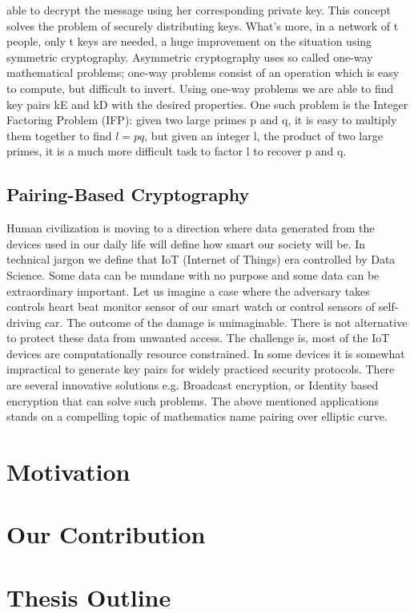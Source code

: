 able to decrypt the message using her corresponding private key. This concept solves the problem of securely distributing keys. What’s more, in a network of t people, only t keys are needed, a huge improvement on the situation using symmetric cryptography.
Asymmetric cryptography uses so called one-way mathematical problems; one-way problems consist of an operation which is easy to compute, but difficult to invert. Using one-way problems we are able to find key pairs kE and kD with the desired properties.
One such problem is the Integer Factoring Problem (IFP): given two large primes p and q, it is easy to multiply them together to find $l = pq$, but given an integer l, the product of two large primes, it is a much more difficult task to factor l to recover p and q.

\subsection{Pairing-Based Cryptography}
\label{ch1_subsec_pbc}
Human civilization is moving to a direction where data generated from the devices used in our daily life will define how smart our society will be.
In technical jargon we define that IoT (Internet of Things) era controlled by Data Science.
Some data can be mundane with no purpose and some data can be extraordinary important.
Let us imagine a case where the adversary takes controls heart beat monitor sensor of our smart watch or control sensors of self-driving car.
The outcome of the damage is unimaginable. 
There is not alternative to protect these data from unwanted access.
The challenge is, most of the IoT devices are computationally resource constrained.
In some devices it is somewhat impractical to generate key pairs for widely practiced security protocols.
There are several innovative solutions e.g. Broadcast encryption, or Identity based encryption that can solve such problems.
The above mentioned applications stands on a compelling topic of mathematics name pairing over elliptic curve.

\section{Motivation}
\label{ch1_sec_motivation}

\section{Our Contribution}
\label{ch1_sec_contribution}


\section{Thesis Outline}
\label{ch1_sec_outline}

